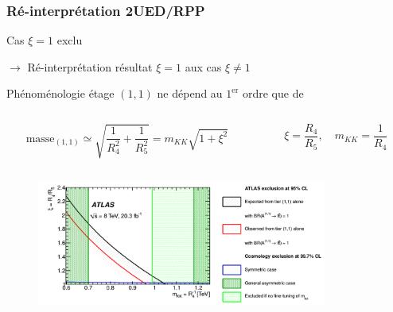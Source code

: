\begin{frame}
\frametitle{R\'e-interprétation 2UED/RPP}

\begin{small}
\begin{maliste}
\item Cas $\xi=1$ exclu \\
\begin{center}
$\rightarrow$ R\'e-interpr\'etation r\'esultat $\xi=1$ aux cas $\xi\neq 1$
\end{center}
\vspace*{0.2cm}
\item Phénoménologie étage $(1,1)$ ne dépend au $1^\text{er}$ ordre que de 
\begin{columns}
\begin{column}{0.7\textwidth}
\begin{small}
\[\text{masse}_{(1,1)}\simeq\sqrt{\frac{1}{R_4^2}+\frac{1}{R_5^2}}=m_{KK}\sqrt{1+\xi^2}\]
\end{small}
\end{column}
\begin{column}{0.3\textwidth}
\begin{varblock}[3cm]{}
\[\xi=\frac{R_4}{R_5},\quad m_{KK}=\frac{1}{R_4}\]
\end{varblock}
\end{column}
\end{columns}
\end{maliste}
\end{small}

\begin{figure}[!htb]
\begin{center}
\hspace*{-1cm}
\includegraphics[width=0.85\textwidth]{Figures/FourTops/fig_12.png}
\end{center}
\end{figure}
\end{frame}

